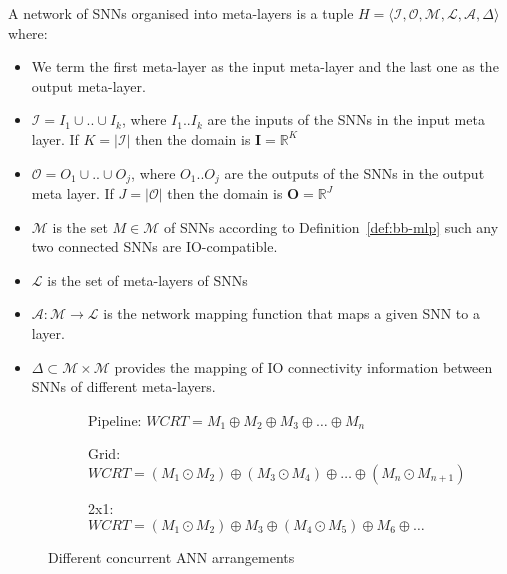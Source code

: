 \begin{definition}
	\label{def:nsanns}
	A network of \acp{SNN} organised into meta-layers is a tuple $H = \langle \mathcal{I}, \mathcal{O}, \mathcal{M}, \mathcal{L}, \mathcal{A}, \Delta \rangle$ where:
	\begin{itemize}
		\item We term the first meta-layer as the input
		meta-layer and the last one as the output
		meta-layer.
		\item  $\mathcal{I}=I_1 \cup .. \cup I_k$,
		where $I_1..I_k$ are the inputs of the \acp{SNN} in
		the input meta layer. If $K=|\mathcal{I}|$ then the
		domain is $\mathbf{I} = \mathbb{R}^K$
		\item $\mathcal{O}=O_1 \cup .. \cup O_j$,
		where $O_1..O_j$ are the outputs of the \acp{SNN} in
		the output meta layer. If $J=|\mathcal{O}|$ then the domain is $\mathbf{O} = \mathbb{R}^J$
		\item $\mathcal{M}$ is the set $M \in \mathcal{M}$ of
		\acp{SNN} according to Definition~\ref{def:bb-mlp}
		such any two connected \acp{SNN} are IO-compatible.
		\item $\mathcal{L}$ is the set of meta-layers of \acp{SNN}
		\item $\mathcal{A}: \mathcal{M} \rightarrow \mathcal{L}$ is the network mapping function that maps a given \ac{SNN} to a layer.
		\item $\Delta \subset \mathcal{M} \times \mathcal{M}$ provides the mapping of IO connectivity information between \acp{SNN} of different meta-layers. %
	\end{itemize}
\end{definition}

\begin{figure}[H]
	\centering
	\begin{subfigure}[t]{0.5\textwidth}
		\centering
		\scalebox{0.8}{}
		\caption{Pipeline: $WCRT = M_1 \oplus M_2 \oplus M_3 \oplus \ldots \oplus M_n$}
		\label{fig:tca-nn-pipeline}
	\end{subfigure}
	
	\vspace{10mm}
	\begin{subfigure}[t]{0.5\textwidth}
		\centering
		\scalebox{0.8}{}
		\caption{Grid: $WCRT = \left(M_1 \odot M_2\right) \oplus \left(M_3 \odot M_4\right) \oplus \ldots \oplus \left(M_n \odot M_{n+1}\right)$}
		\label{fig:tca-nn-grid}
	\end{subfigure}
	
	\vspace{10mm}
	\begin{subfigure}[t]{0.5\textwidth}
		\centering
		\scalebox{0.8}{}
		\caption{2x1: $WCRT = \left(M_1 \odot M_2\right) \oplus M_3 \oplus \left(M_4 \odot M_5\right) \oplus M_6 \oplus \ldots$}
		\label{fig:tca-nn-someparallel}
	\end{subfigure}
	
	\caption{Different concurrent \ac{ANN} arrangements}
	\label{fig:tca-nn}
\end{figure}

